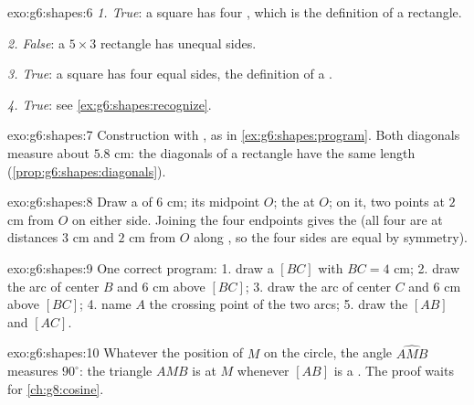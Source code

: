 \begin{solution}{exo:g6:shapes:6}
\emph{1. True}: a square has four , which is the
definition of a rectangle.

\emph{2. False}: a $5 \times 3$ rectangle has unequal sides.

\emph{3. True}: a square has four equal sides, the definition of a
.

\emph{4. True}: see \cref{ex:g6:shapes:recognize}.
\end{solution}

\begin{solution}{exo:g6:shapes:7}
Construction with , as in \cref{ex:g6:shapes:program}.
Both diagonals measure about $5.8$ cm: the diagonals of a rectangle
have the same length (\cref{prop:g6:shapes:diagonals}).
\end{solution}

\begin{solution}{exo:g6:shapes:8}
Draw a  of $6$ cm; its midpoint $O$; the  at $O$;
on it, two points at $2$ cm from $O$ on either side. Joining the four
endpoints gives the  (all four  are at distances
$3$ cm and $2$ cm from $O$ along , so the four sides
are equal by symmetry).
\end{solution}

\begin{solution}{exo:g6:shapes:9}
One correct program:
1. draw a  $[BC]$ with $BC = 4$ cm;
2. draw the arc of center $B$ and  $6$ cm above $[BC]$;
3. draw the arc of center $C$ and  $6$ cm above $[BC]$;
4. name $A$ the crossing point of the two arcs;
5. draw the  $[AB]$ and $[AC]$.
\end{solution}

\begin{solution}{exo:g6:shapes:10}
Whatever the position of $M$ on the circle, the angle $\widehat{AMB}$
measures $90^\circ$: the triangle $AMB$ is  at $M$
whenever $[AB]$ is a . The proof waits for
\cref{ch:g8:cosine}.
\end{solution}


